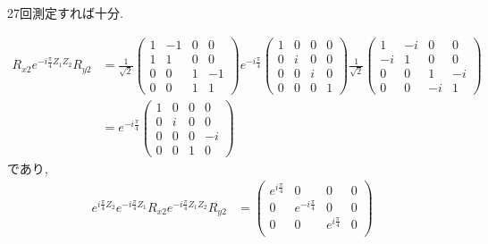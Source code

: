\begin{ex}
    \label{ex7.46}
    27回測定すれば十分.
\end{ex}

\begin{ex}
    \label{ex7.47}
    \begin{align*}
        R_{x2} e^{-i \frac{\pi}{4} Z_1 Z_2} R_{y2}
         & =
        \frac{1}{\sqrt{2}}
        \begin{pmatrix}
            1 & -1 & 0 & 0  \\
            1 & 1  & 0 & 0  \\
            0 & 0  & 1 & -1 \\
            0 & 0  & 1 & 1
        \end{pmatrix}
        e^{-i\frac{\pi}{4}}
        \begin{pmatrix}
            1 & 0 & 0 & 0 \\
            0 & i & 0 & 0 \\
            0 & 0 & i & 0 \\
            0 & 0 & 0 & 1
        \end{pmatrix}
        \frac{1}{\sqrt{2}}
        \begin{pmatrix}
            1  & -i & 0  & 0  \\
            -i & 1  & 0  & 0  \\
            0  & 0  & 1  & -i \\
            0  & 0  & -i & 1
        \end{pmatrix}
        \\
         & =
        e^{-i \frac{\pi}{4}}
        \begin{pmatrix}
            1 & 0 & 0 & 0  \\
            0 & i & 0 & 0  \\
            0 & 0 & 0 & -i \\
            0 & 0 & 1 & 0
        \end{pmatrix}
    \end{align*}
    であり,
    \begin{align*}
        e^{i \frac{\pi}{4}Z_2}e^{-i\frac{\pi}{4}Z_1}R_{x2} e^{-i \frac{\pi}{4} Z_1 Z_2}  R_{y2}
         & =
        \begin{pmatrix}
            e^{i\frac{\pi}{4}} & 0                   & 0                  & 0                    \\
            0                  & e^{-i\frac{\pi}{4}} & 0                  & 0                    \\
            0                  & 0                   & e^{i\frac{\pi}{4}} & 0                    \\

\end{pmatrix}
\end{align*}
\end{ex}
